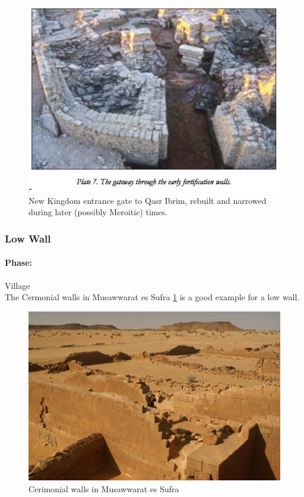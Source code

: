 \documentclass[a4paper,12pt]{scrreprt}
\begin{document}
\begin{figure}[H]
	\centering
	\includegraphics[width=\textwidth]{img/walls_gates/new_kingdom_entrance_gate}
	\caption{New Kingdom entrance gate to Qasr Ibrim, rebuilt and narrowed during later (possibly Meroitic) times.}
\end{figure}

\subsubsection{Low Wall}

\paragraph{Phase:} Village\\

The Cermonial walls in Musawwarat es Sufra \ref{fig:low_wall} is a good example for a low wall.

\begin{figure}[H]
	\centering
	\includegraphics[width=\textwidth]{img/walls_gates/cermonial_wall}
	\caption{Cerimonial walls in Musawwarat es Sufra}\label{fig:low_wall}
\end{figure}
\end{document}
